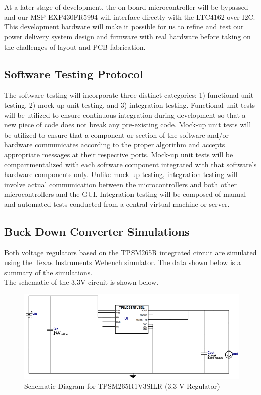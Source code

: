 \documentclass[12pt]{article}
\begin{document}
\hfill \\
\pagebreak
\hfill \\
\indent
At a later stage of development, the on-board microcontroller will be bypassed and our MSP-EXP430FR5994 will interface directly with the LTC4162 over I2C.\\
This development hardware will make it possible for us to refine and test our power delivery system design and firmware with real hardware before taking on the challenges of layout and PCB fabrication.

\subsection{Software Testing Protocol}
\indent \indent
The software testing will incorporate three distinct categories: 1) functional unit testing, 2) mock-up unit testing, and 3) integration testing.  Functional unit tests will be utilized to ensure continuous integration during development so that a new piece of code does not break any pre-existing code.  Mock-up unit tests will be utilized to ensure that a component or section of the software and/or hardware communicates according to the proper algorithm and accepts appropriate messages at their respective ports.  Mock-up unit tests will be compartmentalized with each software component integrated with that software’s hardware components only.  Unlike mock-up testing, integration testing will involve actual communication between the microcontrollers and both other microcontrollers and the GUI.  Integration testing will be composed of manual and automated tests conducted from a central virtual machine or server.

\pagebreak

\subsection{Buck Down Converter Simulations}

\indent \indent
Both voltage regulators based on the TPSM265R integrated circuit are simulated using the Texas Instruments Webench simulator. The data shown below is a summary of the simulations.\\

\noindent
The schematic of the 3.3V circuit is shown below. 

\begin{figure}[h!]
\centering
\includegraphics[width=0.9\linewidth]{3V_schem}
\caption{Schematic Diagram for TPSM265R1V3SILR (3.3 V Regulator)}
\end{figure}
\end{document}
